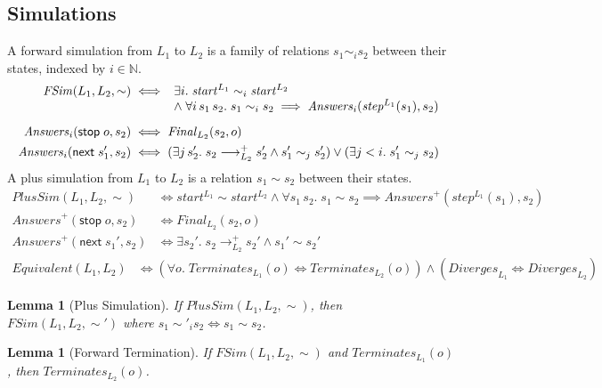 \documentclass[10pt]{article}
\theoremstyle{acmplain}
\newtheorem{lemma}[theorem]{Lemma}
\newcommand{\key}[1]{\mathsf{#1}}
\newcommand{\nxt}{\key{next}\;}
\newcommand{\stp}{\key{stop}\;}
\newcommand{\step}[1]{\mathit{step}^{#1}}
\newcommand{\start}[1]{\mathit{start}^{#1}}
\newcommand{\Final}{\mathit{Final}}
\newcommand{\Term}{\mathit{Terminates}}
\newcommand{\Div}{\mathit{Diverges}}
\newcommand{\Equiv}{\mathit{Equivalent}}
\newcommand{\FSim}{\mathit{FSim}}
\newcommand{\lto}{\longrightarrow}
\begin{document}
\subsection{Simulations}\label{sec:sims}

A forward simulation from $L_1$ to $L_2$ is a family of relations
$s_1 \sim_i s_2$ between their states, indexed by $i \in \mathbb{N}$.
\begin{align*}
  \FSim(L_1, L_2, \sim) &\iff
  \begin{array}[t]{l}
    \exists i.\; \start{L_1} \sim_i \start{L_2} \\
    \land\; \forall i\, s_1\, s_2.\; s_1 \sim_i s_2 \implies \mathit{Answers}_i(\step{L_1}(s_1), s_2)
  \end{array} \\[1ex]
  \mathit{Answers}_i(\stp o, s_2) &\iff \Final_{L_2}(s_2, o) \\
  \mathit{Answers}_i(\nxt s_1', s_2) &\iff
    (\exists j\, s_2'.\; s_2 \lto_{L_2}^+ s_2' \land s_1' \sim_j s_2')
    \lor (\exists j < i.\; s_1' \sim_j s_2)
\end{align*}
A plus simulation from $L_1$ to $L_2$ is a relation $s_1 \sim s_2$ between their states.
\begin{align*}
  \mathit{PlusSim}(L_1, L_2, \sim) &\iff
    \start{L_1} \sim \start{L_2} \land
    \forall s_1\, s_2.\; s_1 \sim s_2 \implies \mathit{Answers}^+(\step{L_1}(s_1), s_2) \\[1ex]
  \mathit{Answers}^+(\stp o, s_2) &\iff \Final_{L_2}(s_2, o) \\
  \mathit{Answers}^+(\nxt s_1', s_2) &\iff \exists s_2'.\; s_2 \lto_{L_2}^+ s_2' \land s_1' \sim s_2'
\end{align*}
\begin{align*}
  \Equiv(L_1, L_2) &\iff
    (\forall o.\; \Term_{L_1}(o) \iff \Term_{L_2}(o)) \land (\Div_{L_1} \iff \Div_{L_2})
\end{align*}

\begin{lemma}[Plus Simulation]\label{lem:plus-sim}
If $\mathit{PlusSim}(L_1, L_2, \sim)$, then $\FSim(L_1, L_2, \sim')$
where $s_1 \sim'_i s_2 \iff s_1 \sim s_2$.
\end{lemma}

\begin{lemma}[Forward Termination]\label{lem:fwd-term}
If $\FSim(L_1, L_2, \sim)$ and $\Term_{L_1}(o)$, then $\Term_{L_2}(o)$.
\end{lemma}
\end{document}

